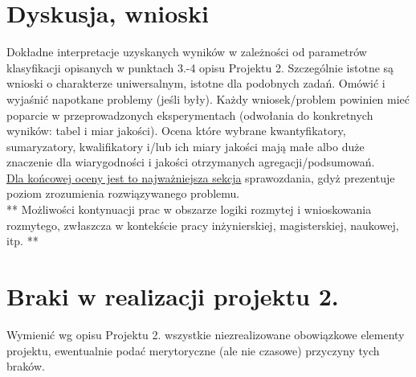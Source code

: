\documentclass{classrep}
\begin{document}

% 
% 
% 

\section{Dyskusja, wnioski}
Dokładne interpretacje uzyskanych wyników w zależności od parametrów klasyfikacji
opisanych w punktach 3.-4 opisu Projektu 2. 
Szczególnie istotne są wnioski o charakterze uniwersalnym, istotne dla podobnych zadań. 
Omówić i wyjaśnić napotkane problemy (jeśli były). Każdy wniosek/problem powinien mieć poparcie
w przeprowadzonych eksperymentach (odwołania do konkretnych wyników: tabel i miar
jakości). Ocena które wybrane kwantyfikatory, sumaryzatory, kwalifikatory i/lub ich
miary jakości mają małe albo duże znaczenie dla wiarygodności i jakości otrzymanych
agregacji/podsumowań.  \\
\underline{Dla końcowej oceny jest to najważniejsza sekcja} sprawozdania, gdyż prezentuje poziom
zrozumienia rozwiązywanego problemu.\\

** Możliwości kontynuacji prac w obszarze logiki rozmytej i wnioskowania rozmytego, zwłaszcza w kontekście pracy inżynierskiej,
magisterskiej, naukowej, itp. **\\



\section{Braki w realizacji projektu 2.}
Wymienić wg opisu Projektu 2. wszystkie niezrealizowane obowiązkowe elementy projektu, ewentualnie
podać merytoryczne (ale nie czasowe) przyczyny tych braków. 
\end{document}
